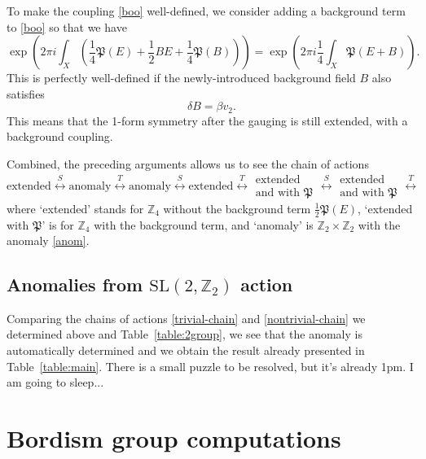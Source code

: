 \documentclass[12pt]{article}
\numberwithin{equation}{section}
\def\bZ{\mathbb{Z}}
\def\SL{\mathrm{SL}}
\begin{document}
To make  the coupling \eqref{boo}  well-defined, we consider adding a background term to \eqref{boo} so that we have \begin{equation}
\exp\left(2\pi i\int_X ( \frac14 \mathfrak{P}(E) +\frac12 B E + \frac14 \mathfrak{P}(B) )\right)
= 
\exp \left(2\pi i \frac14 \int_X \mathfrak{P}(E+B)\right) .
\end{equation}
This is perfectly well-defined if the newly-introduced background field $B$  also satisfies \begin{equation}
\delta B=\beta v_2.
\end{equation}
This means that the 1-form symmetry after the gauging is still extended, with a background coupling.

Combined, the preceding arguments allows us to  see the chain of actions \begin{equation}
\text{extended} \stackrel{S}{\longleftrightarrow} 
\text{anomaly} \stackrel{T}{\longleftrightarrow} 
\text{anomaly} \stackrel{S}{\longleftrightarrow} 
\text{extended} \stackrel{T}{\longleftrightarrow} 
\begin{array}{c}
\text{extended}\\
\text{and with $\mathfrak{P}$} 
\end{array} 
\stackrel{S}{\longleftrightarrow} 
\begin{array}{c}
\text{extended }\\
\text{and with $\mathfrak{P}$} 
\end{array} 
\stackrel{T}{\longleftrightarrow} 
\label{nontrivial-chain}
\end{equation}
where `extended' stands for $\bZ_4$ without the background term $\frac12\mathfrak{P}(E)$,
`extended with $\mathfrak{P}$' is for $\bZ_4$ with the background term,
and `anomaly' is $\bZ_2\times \bZ_2$ with the anomaly \eqref{anom}.


\subsection{Anomalies from $\SL(2,\bZ_2)$ action} 
Comparing the chains of actions \eqref{trivial-chain} and \eqref{nontrivial-chain} we determined above 
and Table~\ref{table:2group},
we see that the anomaly is automatically determined and 
we obtain the result already presented in Table~\ref{table:main}.
There is a small puzzle to be resolved, but it's already 1pm. I am going to sleep...

\appendix
\section{Bordism group computations}
\label{sec:bordism}
\end{document}
